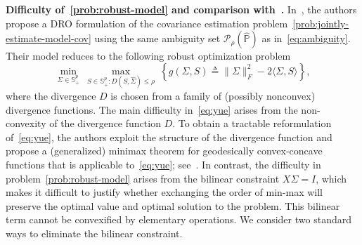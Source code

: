 \documentclass[11pt]{article}
\def\P{\mathbb{P}}
\def\S{\mathbb{S}}
\def\la{\langle}
\def\PSD{{\S^k_{++}}}
\def\ra{\rangle}
\def\P{\mathbb{P}}
\def\S{\mathbb{S}}
\def\la{\langle}
\def\PSD{{\S^p_{+}}}
\def\ra{\rangle}
\newcommand{\wh}{\widehat}
\begin{document}
\noindent \textbf{Difficulty of~\eqref{prob:robust-model} 
and comparison with~\citet{ref:yue2024geometric}.} In~\citet[equation~(4)]{ref:yue2024geometric}, the authors propose a DRO formulation of the covariance estimation problem~\eqref{prob:jointly-estimate-model-cov} using the same ambiguity set $\mathcal{P}_ \rho(\wh{\P})$ as in~\eqref{eq:ambiguity}. Their model reduces to the following robust  optimization problem 
\begin{equation} \label{eq:yue}
    \min_{\Sigma \in \PSD } ~\max\limits_{S \in \PSD: D(S, \widehat{\Sigma}) \le  \rho}~ \left\{ g(\Sigma, S) \triangleq \|\Sigma\|_F^2 - 2 \la \Sigma,S\ra \right\},
\end{equation}
where the divergence $D$ is chosen from a family of (possibly nonconvex) divergence functions. 
The main difficulty in~\eqref{eq:yue} arises from the non-convexity of the divergence function $D$.
To obtain a tractable reformulation of~\eqref{eq:yue}, the authors exploit the structure of the divergence function and propose a (generalized) minimax theorem for geodesically convex-concave functions that is applicable to~\eqref{eq:yue}; see~\cite[theorem~3]{ref:yue2024geometric}. In contrast, the difficulty in problem~\eqref{prob:robust-model} arises from the bilinear constraint $X\Sigma = I$, which makes it difficult to justify whether exchanging the order of min-max will preserve the optimal value and optimal solution to the problem.  This bilinear term cannot be convexified by elementary operations. 
We consider two standard ways to eliminate the bilinear constraint.
\end{document}

